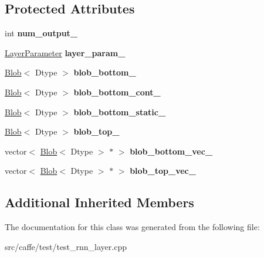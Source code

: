 \subsection*{Protected Attributes}
\begin{DoxyCompactItemize}
\item 
\mbox{\label{classcaffe_1_1_r_n_n_layer_test_aba74ab97eb8c2e967a70301aa961268d}} 
int {\bfseries num\+\_\+output\+\_\+}
\item 
\mbox{\label{classcaffe_1_1_r_n_n_layer_test_a06aaa599760cc99b743504eda901f1c6}} 
\mbox{\hyperlink{classcaffe_1_1_layer_parameter}{Layer\+Parameter}} {\bfseries layer\+\_\+param\+\_\+}
\item 
\mbox{\label{classcaffe_1_1_r_n_n_layer_test_ab4f332d7b3c08b2fd0708d81e834551d}} 
\mbox{\hyperlink{classcaffe_1_1_blob}{Blob}}$<$ Dtype $>$ {\bfseries blob\+\_\+bottom\+\_\+}
\item 
\mbox{\label{classcaffe_1_1_r_n_n_layer_test_a11a022677afcaaf9644958e81715d9c3}} 
\mbox{\hyperlink{classcaffe_1_1_blob}{Blob}}$<$ Dtype $>$ {\bfseries blob\+\_\+bottom\+\_\+cont\+\_\+}
\item 
\mbox{\label{classcaffe_1_1_r_n_n_layer_test_a03b4e927e7a91e36256b4cc923b06f60}} 
\mbox{\hyperlink{classcaffe_1_1_blob}{Blob}}$<$ Dtype $>$ {\bfseries blob\+\_\+bottom\+\_\+static\+\_\+}
\item 
\mbox{\label{classcaffe_1_1_r_n_n_layer_test_a2b7e99ebc182415943799ca0402f27fa}} 
\mbox{\hyperlink{classcaffe_1_1_blob}{Blob}}$<$ Dtype $>$ {\bfseries blob\+\_\+top\+\_\+}
\item 
\mbox{\label{classcaffe_1_1_r_n_n_layer_test_ae33e7fee4db3978cd5558f57d4370b37}} 
vector$<$ \mbox{\hyperlink{classcaffe_1_1_blob}{Blob}}$<$ Dtype $>$ $\ast$ $>$ {\bfseries blob\+\_\+bottom\+\_\+vec\+\_\+}
\item 
\mbox{\label{classcaffe_1_1_r_n_n_layer_test_a90d12aaf34aa5869ed35d5aefb715415}} 
vector$<$ \mbox{\hyperlink{classcaffe_1_1_blob}{Blob}}$<$ Dtype $>$ $\ast$ $>$ {\bfseries blob\+\_\+top\+\_\+vec\+\_\+}
\end{DoxyCompactItemize}
\subsection*{Additional Inherited Members}


The documentation for this class was generated from the following file\+:\begin{DoxyCompactItemize}
\item 
src/caffe/test/test\+\_\+rnn\+\_\+layer.\+cpp\end{DoxyCompactItemize}
